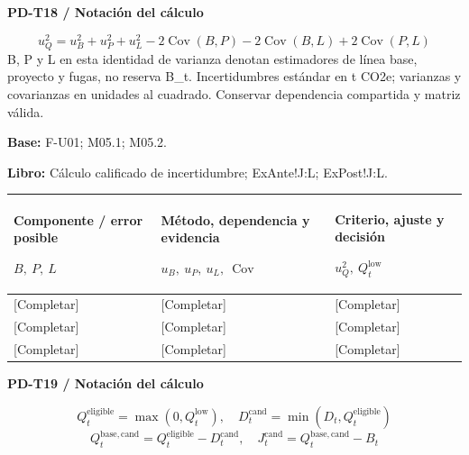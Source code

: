 \par\begingroup\sffamily\fontsize{8}{10}\selectfont\color{NEBGreen}\setlength{\parskip}{2pt}\setlength{\abovedisplayskip}{4pt}\setlength{\belowdisplayskip}{4pt}\setlength{\abovedisplayshortskip}{2pt}\setlength{\belowdisplayshortskip}{3pt}
\textbf{PD-T18 / Notación del cálculo}\par
{\fontsize{9}{11}\selectfont\[ u_Q^2=u_B^2+u_P^2+u_L^2-2\operatorname{Cov}(B,P)-2\operatorname{Cov}(B,L)+2\operatorname{Cov}(P,L) \]}
B, P y L en esta identidad de varianza denotan estimadores de línea base, proyecto y fugas, no reserva B\_t. Incertidumbres estándar en t CO2e; varianzas y covarianzas en unidades al cuadrado. Conservar dependencia compartida y matriz válida.\par
\textbf{Base:} F-U01; M05.1; M05.2.\par
\textbf{Libro:} Cálculo calificado de incertidumbre; ExAnte!J:L; ExPost!J:L.\par\endgroup
{\sffamily\fontsize{8.3}{10.3}\selectfont\begin{longtable}{@{}P{52.79mm} P{59.39mm} P{52.79mm}@{}}
\toprule
\textbf{Componente / error posible}\par {\normalfont\fontsize{8.2}{10}\selectfont $B,\ P,\ L$} & \textbf{Método, dependencia y evidencia}\par {\normalfont\fontsize{8.2}{10}\selectfont $u_B,\ u_P,\ u_L,\ \operatorname{Cov}$} & \textbf{Criterio, ajuste y decisión}\par {\normalfont\fontsize{8.2}{10}\selectfont $u_Q^2,\ Q_t^{\mathrm{low}}$}\\\midrule\endhead
\rule{0pt}{7.7mm}[Completar] & [Completar] & [Completar]\\\hline
\rule{0pt}{7.7mm}[Completar] & [Completar] & [Completar]\\\hline
\rule{0pt}{7.7mm}[Completar] & [Completar] & [Completar]\\\hline
\end{longtable}}
\par\begingroup\sffamily\fontsize{8}{10}\selectfont\color{NEBGreen}\setlength{\parskip}{2pt}\setlength{\abovedisplayskip}{4pt}\setlength{\belowdisplayskip}{4pt}\setlength{\abovedisplayshortskip}{2pt}\setlength{\belowdisplayshortskip}{3pt}
\textbf{PD-T19 / Notación del cálculo}\par
{\fontsize{9}{11}\selectfont\[ Q_t^{\mathrm{eligible}}=\max(0,Q_t^{\mathrm{low}}),\quad D_t^{\mathrm{cand}}=\min(D_t,Q_t^{\mathrm{eligible}}) \]}
{\fontsize{9}{11}\selectfont\[ Q_t^{\mathrm{base,cand}}=Q_t^{\mathrm{eligible}}-D_t^{\mathrm{cand}},\quad J_t^{\mathrm{cand}}=Q_t^{\mathrm{base,cand}}-B_t \]}
